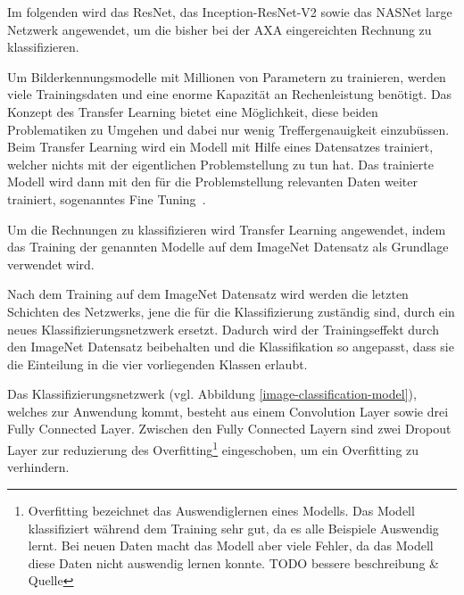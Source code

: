 




Im folgenden wird das ResNet, das Inception-ResNet-V2 sowie das NASNet large Netzwerk angewendet, um die bisher bei der AXA eingereichten Rechnung zu klassifizieren.

Um Bilderkennungsmodelle mit Millionen von Parametern zu trainieren, werden viele Trainingsdaten und eine enorme Kapazität an Rechenleistung benötigt. Das Konzept des Transfer Learning bietet eine Möglichkeit, diese beiden Problematiken zu Umgehen und dabei nur wenig Treffergenauigkeit einzubüssen. Beim Transfer Learning wird ein Modell mit Hilfe eines Datensatzes trainiert, welcher nichts mit der eigentlichen Problemstellung zu tun hat. Das trainierte Modell wird dann mit den für die Problemstellung relevanten Daten weiter trainiert, sogenanntes Fine Tuning~\autocite{TensorflowImageRetraining, TDSTransferLearning}.

Um die Rechnungen zu klassifizieren wird Transfer Learning angewendet, indem das Training der genannten Modelle auf dem ImageNet Datensatz als Grundlage verwendet wird.

Nach dem Training auf dem ImageNet Datensatz wird werden die letzten Schichten des Netzwerks, jene die für die Klassifizierung zuständig sind, durch ein neues Klassifizierungsnetzwerk ersetzt. Dadurch wird der Trainingseffekt durch den ImageNet Datensatz beibehalten und die Klassifikation so angepasst, dass sie die Einteilung in die vier vorliegenden Klassen erlaubt.

Das Klassifizierungsnetzwerk (vgl. Abbildung \ref{image-classification-model}), welches zur Anwendung kommt, besteht aus einem Convolution Layer sowie drei Fully Connected Layer. Zwischen den Fully Connected Layern sind zwei Dropout Layer zur reduzierung des Overfitting\footnote{Overfitting bezeichnet das Auswendiglernen eines Modells. Das Modell klassifiziert während dem Training sehr gut, da es alle Beispiele Auswendig lernt. Bei neuen Daten macht das Modell aber viele Fehler, da das Modell diese Daten nicht auswendig lernen konnte. TODO bessere beschreibung \& Quelle} eingeschoben, um ein Overfitting zu verhindern.

